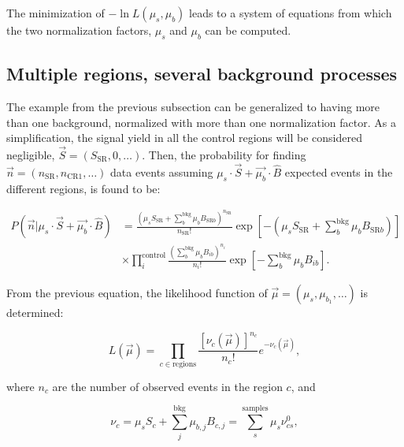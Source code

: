 The minimization of $-\ln{L(\mu_s, \mu_b)}$ leads to a system of equations from which the two normalization factors, $\mu_s$ and $\mu_b$ can be computed.


\subsection{Multiple regions, several background processes}
    \label{subsec:StatisticsMultipleRegionsNoSystematics}

The example from the previous subsection can be generalized to having more than one background, normalized with more than one normalization factor.
As a simplification, the signal yield in all the control regions will be considered negligible, $\vec{S} = (S_{\text{SR}}, 0, \ldots)$.
Then, the probability for finding $\vec{n} = (n_\text{SR}, n_\text{CR1}, \ldots)$ data events assuming $\mu_s \cdot \vec{S} + \vec{\mu_b}\cdot \hat{B}$ expected events in the different regions, is found to be:

\begin{equation}
\begin{split}
P(\vec{n} | \mu_s \cdot \vec{S} + \vec{\mu_b}\cdot \hat{B}) &= \frac{(\mu_s S_{\text{SR}} + \sum_{b}^{\text{bkg}}{\mu_{b} B_{{\text{SR}}b}})^{n_{\text{SR}}}}{n_{{\text{SR}}}!} \exp{\left[-(\mu_s S_{{\text{SR}}} + \sum_{b}^{\text{bkg}}{\mu_{b} B_{{\text{SR}}b}})\right]} \\
& \times \prod_{i}^{\text{control}}{ \frac{\left(\sum_{b}^{\text{bkg}}{\mu_{b} B_{ib}}\right)^{n_{i}}}{n_{i}!}} \exp{\left[-\sum_{b}^{\text{bkg}}\mu_{b} B_{ib}\right] }.
\end{split}
\label{eq:simplifiedPoissonSeveralBkg}
\end{equation}

From the previous equation, the likelihood function of $\vec{\mu} = (\mu_s, \mu_{b_1}, \ldots)$ is determined:

\begin{equation}
L(\vec{\mu}) = 
 \prod_{c \in \text{regions}}{\frac{[\nu_c(\vec{\mu})]^{n_c}}{n_c!}e^{-\nu_c(\vec{\mu})}},
\label{eq:generalLikelihoodNoSystematics}
\end{equation}

\noindent where $n_c$ are the number of observed events in the region $c$, and

\begin{equation}
\nu_c = \mu_s S_c + \sum_{j}^{\text{bkg}}{\mu_{b,j}B_{c,j}} = \sum_{s}^{\text{samples}}{\mu_s \nu_{cs}^0},
\label{eq:definitionNuSimple}
\end{equation}

